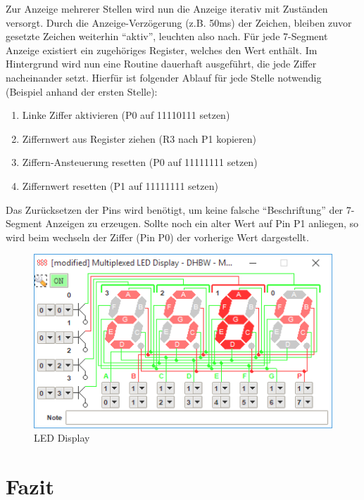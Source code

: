 \documentclass[11pt,ngerman]{report}
\begin{document}
Zur Anzeige mehrerer Stellen wird nun die Anzeige iterativ mit Zuständen versorgt. Durch die Anzeige-Verzögerung (z.B. 50ms) der Zeichen, bleiben zuvor gesetzte Zeichen weiterhin “aktiv”, leuchten also nach. Für jede 7-Segment Anzeige existiert ein zugehöriges Register, welches den Wert enthält. Im Hintergrund wird nun eine Routine dauerhaft ausgeführt, die jede Ziffer nacheinander setzt. Hierfür ist folgender Ablauf für jede Stelle notwendig (Beispiel anhand der ersten Stelle):

\begin{enumerate}
	\item Linke Ziffer aktivieren (P0 auf 11110111 setzen)
	\item Ziffernwert aus Register ziehen (R3 nach P1 kopieren)
	\item Ziffern-Ansteuerung resetten (P0 auf 11111111 setzen)
	\item Ziffernwert resetten (P1 auf 11111111 setzen)
\end{enumerate}

Das Zurücksetzen der Pins wird benötigt, um keine falsche “Beschriftung” der 7-Segment Anzeigen zu erzeugen. Sollte noch ein alter Wert auf Pin P1 anliegen, so wird beim wechseln der Ziffer (Pin P0) der vorherige Wert dargestellt. 

\begin{figure}[h]
	\caption{LED Display}
	\centering
	\includegraphics[width=\textwidth]{leddisplay.png}
\end{figure}


\chapter{Fazit}
 
\end{document}
